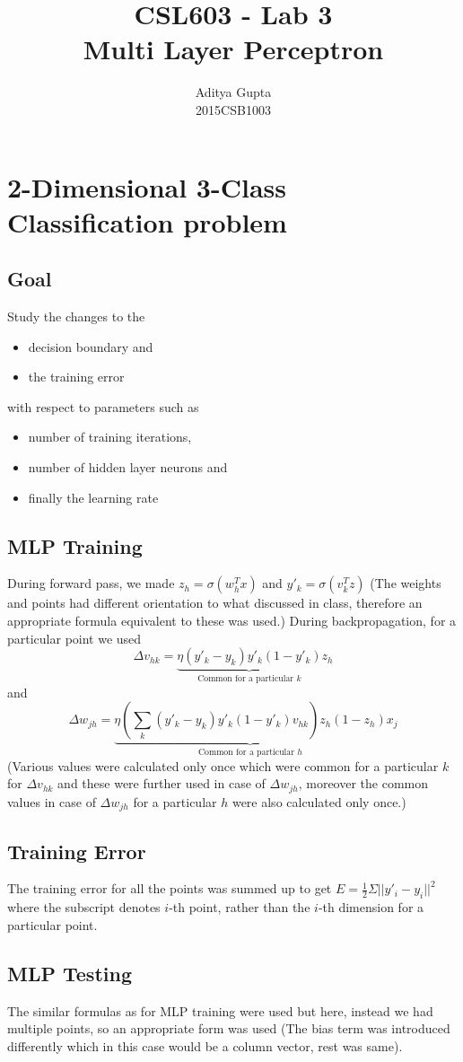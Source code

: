 \documentclass{article}
\title{CSL603 - Lab 3\\Multi Layer Perceptron}
\author{Aditya Gupta\\2015CSB1003}
\begin{document}
\maketitle
\section{2-Dimensional 3-Class Classification problem}
\subsection{Goal} Study the changes to the 
\begin{itemize}
\item decision boundary and 
\item the training error
\end{itemize} with respect to parameters such as 
\begin{itemize}
\item number of training iterations,
\item number of hidden layer neurons and
\item finally the learning rate
\end{itemize}
\subsection{MLP Training}
During forward pass, we made $z_h=\sigma(w_h^Tx)$ and $y'_k=\sigma(v_k^Tz)$ (The weights and points had different orientation to what discussed in class, therefore an appropriate formula equivalent to these was used.)
During backpropagation, for a particular point we used $$\Delta v_{hk}=\underbrace{\eta(y'_k-y_k)y'_k(1-y'_k)}_{\text{Common for a particular } k}z_h$$ and $$\Delta w_{jh}=\underbrace{\eta\left(\sum_k(y'_k-y_k)y'_k(1-y'_k)v_{hk}\right)z_h(1-z_h)}_{\text{Common for a particular }h}x_j$$ (Various values were calculated only once which were common for a particular $k$ for $\Delta v_{hk}$ and these were further used in case of $\Delta w_{jh}$, moreover the common values in case of $\Delta w_{jh}$ for a particular $h$ were also calculated only once.)
\subsection{Training Error}
The training error for all the points was summed up to get $E=\frac 12\Sigma||y'_i-y_i||^2$ where the subscript denotes $i$-th point, rather than the $i$-th dimension for a particular point.
\subsection{MLP Testing}
The similar formulas as for MLP training were used but here, instead we had multiple points, so an appropriate form was used (The bias term was introduced differently which in this case would be a column vector, rest was same).
\end{document}
